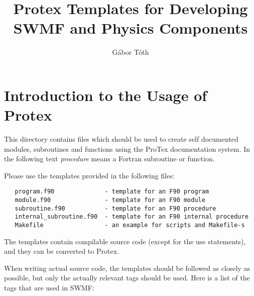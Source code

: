 \documentclass[10pt]{article}
\title{Protex Templates for Developing SWMF and Physics Components}
\author{G\'abor T\'oth}
\begin{document}
\maketitle

\tableofcontents

\section{Introduction to the Usage of Protex}

This directory contains files which should be used to create self documented
modules, subroutines and functions using the ProTex documentation system.
In the following text {\it procedure} means a Fortran subroutine or function.

Please use the templates provided in the following files:
\begin{verbatim}
   program.f90              - template for an F90 program
   module.f90               - template for an F90 module
   subroutine.f90           - template for an F90 procedure
   internal_subroutine.f90  - template for an F90 internal procedure
   Makefile                 - an example for scripts and Makefile-s
\end{verbatim}
The templates contain compilable source code (except for the use statements), 
and they can be converted to Protex. 

When writing actual source code, the templates should be followed as closely 
as possible, but only the actually relevant tags should be used.
Here is a list of the tags that are used in SWMF:

\newpage
\end{document}
